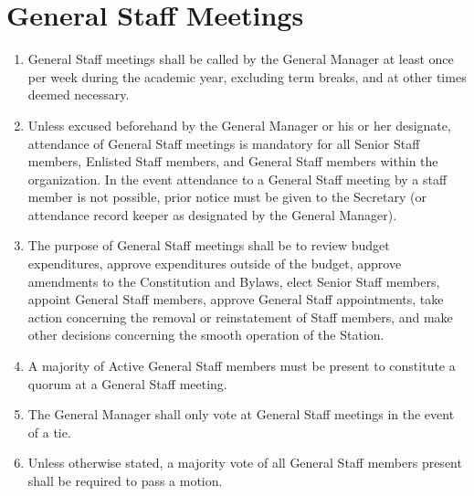 \documentclass[12pt]{constitution}
\begin{document}
\section{​General Staff Meetings}
\begin{enumerate}
\item General Staff meetings shall be called by the General Manager at least once per week during the academic year, excluding term breaks, and at other times deemed necessary.
\item\label{attendance} Unless excused beforehand by the General Manager or his or her designate, attendance of General Staff meetings is mandatory for all Senior Staff members, Enlisted Staff members, and General Staff members within the organization. In the event attendance to a General Staff meeting by a staff member is not possible, prior notice must be given to the Secretary (or attendance record keeper as designated by the General Manager).
\item The purpose of General Staff meetings shall be to review budget expenditures, approve expenditures outside of the budget, approve amendments to the Constitution and Bylaws, elect Senior Staff members, appoint General Staff members, approve General Staff appointments, take action concerning the removal or reinstatement of Staff members, and make other decisions concerning the smooth operation of the Station.
\item A majority of Active General Staff members must be present to constitute a quorum at a General Staff meeting.
\item The General Manager shall only vote at General Staff meetings in the event of a tie.
\item Unless otherwise stated, a majority vote of all General Staff members present shall be required to pass a motion.
\end{enumerate}
\end{document}

